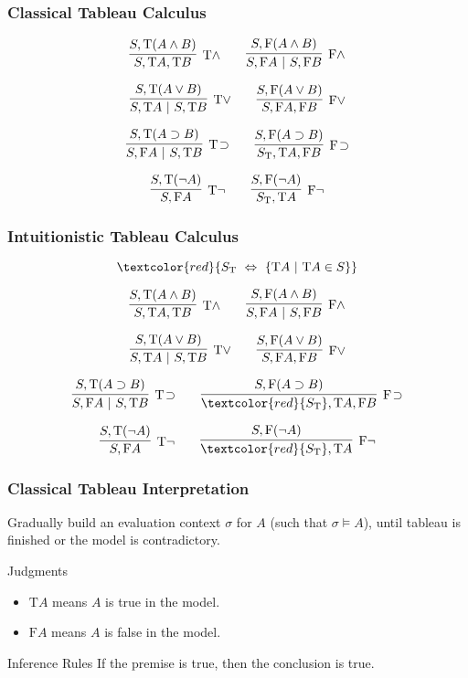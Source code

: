 \documentclass[mathserif]{beamer}
\def\|{~|~}
\def\T{\textrm{T}}
\def\F{\textrm{F}}
\def\imp{\supset}
\def\dfn{~\Leftrightarrow~}
\newcommand{\diff}[1]{\textcolor{red}{#1}}
\newcommand{\sat}[1]{\sigma \vDash #1}
\begin{document}
\begin{frame}
\frametitle{Classical Tableau Calculus}

$$
\infer
  [\T \land]
  {S , \T A , \T B}
{
  {S , \T(A \land B)}
}
\qquad
\infer
  [\F \land]
  {S, \F A \| S, \F B}
{
  {S, \F(A \land B)}
}
$$

$$
\infer
  [\T \lor]
  {S , \T A \| S , \T B}
{
  {S , \T(A \lor B)}
}
\qquad
\infer
  [\F \lor]
  {S, \F A , \F B}
{
  {S, \F(A \lor B)}
}
$$

$$
\infer
  [\T \! \imp]
  {S , \F A \| S , \T B}
{
  {S , \T(A \imp B)}
}
\qquad
\infer
  [\F \! \imp]
  {S_{\T}, \T A , \F B}
{
  {S, \F(A \imp B)}
}
$$

$$
\infer
  [\T \neg]
  {S , \F A}
{
  {S , \T(\neg A)}
}
\qquad
\infer
  [\F \neg]
  {S_{\T}, \T A}
{
  {S, \F(\neg A)}
}
$$

\end{frame}


\begin{frame}[label=calculus]
\frametitle{Intuitionistic Tableau Calculus}

$$
\diff{S_{\T} \dfn \{ \T A \| \T A \in S \}}
$$

$$
\infer
  [\T \land]
  {S , \T A , \T B}
{
  {S , \T(A \land B)}
}
\qquad
\infer
  [\F \land]
  {S, \F A \| S, \F B}
{
  {S, \F(A \land B)}
}
$$

$$
\infer
  [\T \lor]
  {S , \T A \| S , \T B}
{
  {S , \T(A \lor B)}
}
\qquad
\infer
  [\F \lor]
  {S, \F A , \F B}
{
  {S, \F(A \lor B)}
}
$$

$$
\infer
  [\T \! \imp]
  {S , \F A \| S , \T B}
{
  {S , \T(A \imp B)}
}
\qquad
\infer
  [\F \! \imp]
  {\diff{S_{\T}}, \T A , \F B}
{
  {S, \F(A \imp B)}
}
$$

$$
\infer
  [\T \neg]
  {S , \F A}
{
  {S , \T(\neg A)}
}
\qquad
\infer
  [\F \neg]
  {\diff{S_{\T}}, \T A}
{
  {S, \F(\neg A)}
}
$$

\end{frame}


\begin{frame}
\frametitle{Classical Tableau Interpretation}

Gradually build an evaluation context $\sigma$ for $A$ (such that $\sat{A}$),
until tableau is finished or the model is contradictory.

\begin{block}{Judgments}
\begin{itemize}
\item $\T A$ means $A$ is true in the model.
\item $\F A$ means $A$ is false in the model.
\end{itemize}
\end{block}

\begin{block}{Inference Rules}
If the premise is true, then the conclusion is true.
\end{block}

\end{frame}
\end{document}
